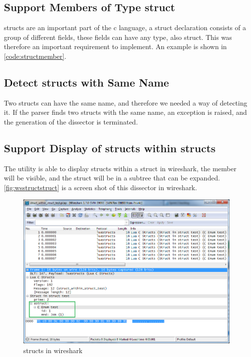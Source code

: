 

\subsection{Support Members of Type \Gls{struct}}
\Glspl{struct} are an important part of the \Gls{c} language, a \gls{struct} declaration consists 
of a group of different fields, these fields can have any type, also \gls{struct}. 
This was therefore an important requirement to implement. An example is shown 
in \autoref{code:structmember}.



\subsection{Detect \Glspl{struct} with Same Name}
Two \glspl{struct} can have the same name, and therefore we needed a way of detecting it. 
If the \gls{parser} finds two \glspl{struct} with the same name, an exception is 
raised, and the generation of the \gls{dissector} is terminated.

\subsection{Support Display of \Glspl{struct} within \Glspl{struct}}
The \gls{utility} is able to display \glspl{struct} within a \gls{struct} in \Gls{wireshark}, the 
\gls{member} will be visible, and the \gls{struct} will be in a subtree that can be 
expanded. \autoref{fig:wsstructstruct} is a screen shot of this \gls{dissector} in 
\Gls{wireshark}.

\begin{figure}[htb]
	\center
	\includegraphics[width=\textwidth]{./sprints/img/wireshark_structwithstruct}
	\caption{\Glspl{struct} in \Gls{wireshark}\label{fig:wsstructstruct}}
\end{figure}

